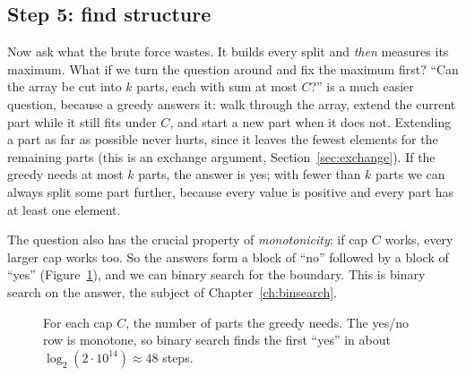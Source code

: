 \subsection{Step 5: find structure}

Now ask what the brute force wastes. It builds every split and \emph{then} measures its maximum. What if we turn the
question around and fix the maximum first? ``Can the array be cut into $k$ parts, each with sum at most $C$?'' is a much
easier question, because a greedy answers it: walk through the array, extend the current part while it still fits under
$C$, and start a new part when it does not. Extending a part as far as possible never hurts, since it leaves the fewest
elements for the remaining parts (this is an exchange argument, Section~\ref{sec:exchange}). If the greedy needs at most $k$
parts, the answer is yes; with fewer than $k$ parts we can always split some part further, because every value is positive
and every part has at least one element.

The question also has the crucial property of \emph{monotonicity}: if cap $C$ works, every larger cap works too. So the
answers form a block of ``no'' followed by a block of ``yes'' (Figure~\ref{fig:arraydiv-mono}), and we can binary search for
the boundary. This is binary search on the answer, the subject of Chapter~\ref{ch:binsearch}.

\begin{figure}[htbp]
\centering
{}
\caption{For each cap $C$, the number of parts the greedy needs. The yes/no row is monotone, so binary search finds the
first ``yes'' in about $\log_2(2\cdot 10^{14}) \approx 48$ steps.}
\label{fig:arraydiv-mono}
\end{figure}

